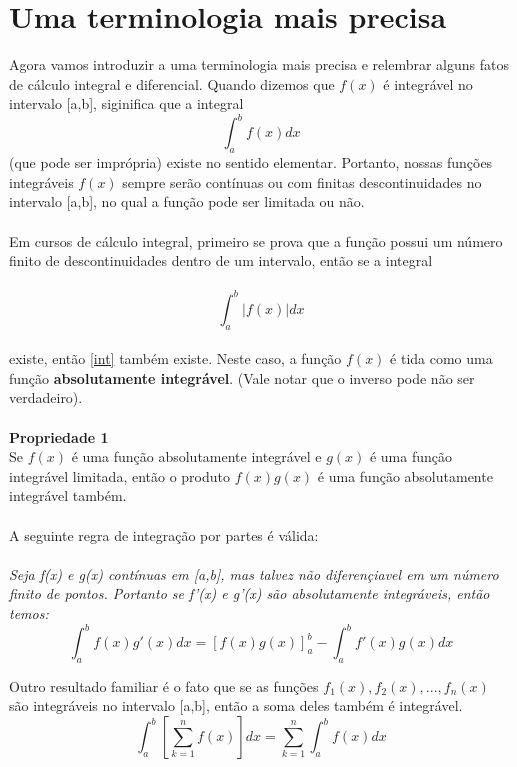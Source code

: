 \documentclass{article}
\begin{document}
\section{ Uma terminologia mais precisa}
Agora vamos introduzir a uma terminologia mais precisa e relembrar alguns fatos
de cálculo integral e diferencial. Quando dizemos que $f(x)$ é integrável no 
intervalo [a,b], siginifica que a integral\\
\begin{equation}
\label{int}
    \int_{a}^{b}f(x)dx 
\end{equation}
(que pode ser imprópria) existe no sentido elementar. Portanto, nossas funções 
integráveis $f(x)$ sempre serão contínuas ou com finitas descontinuidades no 
intervalo [a,b], no qual a função pode ser limitada ou não.\\
\\
Em cursos de cálculo integral, primeiro se prova que a função possui um número
finito de descontinuidades dentro de um intervalo, então se a integral\\
\\
\begin{equation}
    \int_{a}^{b}|f(x)|dx 
\end{equation} 
\\
existe, então \ref{int} também existe. Neste caso, a função $f(x)$ é tida como
uma função \textbf{absolutamente integrável}. (Vale notar que o inverso pode não
ser verdadeiro).\\
\\
\textbf{Propriedade 1}\\
Se $f(x)$ é uma função absolutamente integrável e $g(x)$ é uma função integrável
limitada, então o produto $f(x)g(x)$ é uma função absolutamente integrável também.
\\
\\
A seguinte regra de integração por partes é válida:\\
\\
\textit{Seja f(x) e g(x) contínuas em [a,b], mas talvez não diferençiavel
em um número finito de pontos. Portanto se f'(x) e g'(x) são absolutamente 
integráveis, então temos:}\\
\begin{equation}
    \int_{a}^{b}f(x)g'(x) dx = [f(x)g(x)]_{a}^{b} - \int_{a}^{b}f'(x)g(x) dx
\end{equation}

Outro resultado familiar é o fato que se as funções $f_1(x), f_2(x), ..., f_n(x)$
são integráveis no intervalo [a,b], então a soma deles também é integrável.\\
\begin{equation}
\label{43}
    \int_{a}^{b}[\sum\limits_{k=1}^{n}f(x)]dx = \sum\limits_{k=1}^{n}\int_{a}^{b}f(x)dx
\end{equation}
\end{document}
